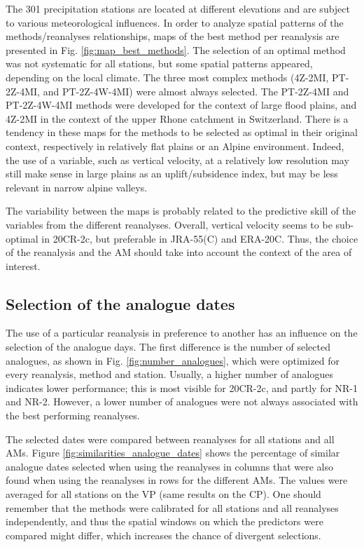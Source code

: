 \documentclass{ametsoc}
\begin{document}
	The 301 precipitation stations are located at different elevations and are subject to various meteorological influences. In order to analyze spatial patterns of the methods/reanalyses relationships, maps of the best method per reanalysis are presented in Fig. \ref{fig:map_best_methods}. The selection of an optimal method was not systematic for all stations, but some spatial patterns appeared, depending on the local climate. The three most complex methods (4Z-2MI, PT-2Z-4MI, and PT-2Z-4W-4MI) were almost always selected. The PT-2Z-4MI and PT-2Z-4W-4MI methods were developed for the context of large flood plains, and 4Z-2MI in the context of the upper Rhone catchment in Switzerland. There is a tendency in these maps for the methods to be selected as optimal in their original context, respectively in relatively flat plains or an Alpine environment. Indeed, the use of a variable, such as vertical velocity, at a relatively low resolution may still make sense in large plains as an uplift/subsidence index, but may be less relevant in narrow alpine valleys.
	
	The variability between the maps is probably related to the predictive skill of the variables from the different reanalyses. Overall, vertical velocity seems to be sub-optimal in 20CR-2c, but preferable in JRA-55(C) and ERA-20C. Thus, the choice of the reanalysis and the AM should take into account the context of the area of interest.
	
	
	\subsection{Selection of the analogue dates}
	
	The use of a particular reanalysis in preference to another has an influence on the selection of the analogue days. The first difference is the number of selected analogues, as shown in Fig. \ref{fig:number_analogues}, which were optimized for every reanalysis, method and station. Usually, a higher number of analogues indicates lower performance; this is most visible for 20CR-2c, and partly for NR-1 and NR-2. However, a lower number of analogues were not always associated with the best performing reanalyses.
	
	The selected dates were compared between reanalyses for all stations and all AMs. Figure \ref{fig:similarities_analogue_dates} shows the percentage of similar analogue dates selected when using the reanalyses in columns that were also found when using the reanalyses in rows for the different AMs. The values were averaged for all stations on the VP (same results on the CP). One should remember that the methods were calibrated for all stations and all reanalyses independently, and thus the spatial windows on which the predictors were compared might differ, which increases the chance of divergent selections.
	
\end{document}
